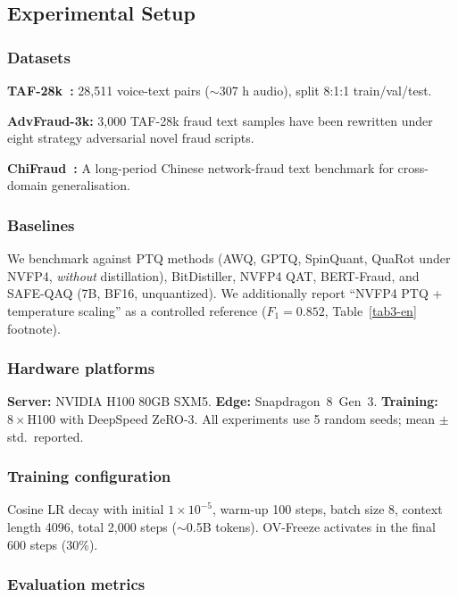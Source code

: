 \documentclass[lettersize,journal]{IEEEtran}
\begin{document}
\subsection{Experimental Setup}
\subsubsection{Datasets} 

\textbf{TAF-28k~\cite{1}:} 28{,}511 voice-text pairs ($\sim$307 h audio), split 8:1:1 train/val/test.

\textbf{AdvFraud-3k:} 3{,}000 TAF-28k fraud text samples have been rewritten under eight strategy adversarial novel fraud scripts.

\textbf{ChiFraud~\cite{chifraud}:} A long-period Chinese network-fraud text benchmark for cross-domain generalisation.

\subsubsection{Baselines}

We benchmark against PTQ methods (AWQ, GPTQ, SpinQuant, QuaRot under NVFP4, \emph{without} distillation), BitDistiller, NVFP4 QAT, BERT-Fraud, and SAFE-QAQ (7B, BF16, unquantized). We additionally report ``NVFP4 PTQ + temperature scaling'' as a controlled reference ($F_1=0.852$, Table~\ref{tab3-en} footnote).

\subsubsection{Hardware platforms}

\textbf{Server:} NVIDIA H100 80GB SXM5. \textbf{Edge:} Snapdragon~8~Gen~3. \textbf{Training:} $8\times$H100 with DeepSpeed ZeRO-3. All experiments use 5 random seeds; mean $\pm$ std.\ reported.

\subsubsection{Training configuration}

Cosine LR decay with initial $1\times 10^{-5}$, warm-up 100 steps, batch size 8, context length 4096, total 2{,}000 steps ($\sim$0.5B tokens). OV-Freeze activates in the final 600 steps (30\%).

\subsubsection{Evaluation metrics}
\end{document}
